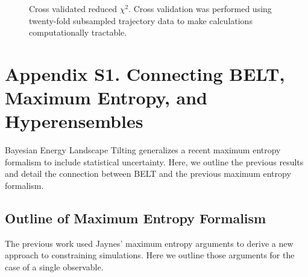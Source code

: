 \documentclass[12pt]{article}
\begin{document}
\begin{figure}

\caption{
Cross validated reduced $\chi^2$.  Cross validation was performed using twenty-fold subsampled trajectory data to make calculations computationally tractable.  
}
\label{figure:cross_val}
\end{figure}


\clearpage

\section*{Appendix S1.  Connecting BELT, Maximum Entropy, and Hyperensembles}

Bayesian Energy Landscape Tilting generalizes a recent maximum entropy formalism \cite{chodera2012} to include statistical uncertainty.  Here, we outline the previous results and detail the connection between BELT and the previous maximum entropy formalism.  

\subsection*{Outline of Maximum Entropy Formalism}

The previous work \cite{chodera2012} used Jaynes' maximum entropy arguments \cite{jaynes1957information} to derive a new approach to constraining simulations.  Here we outline those arguments for the case of a single observable.  
\end{document}
